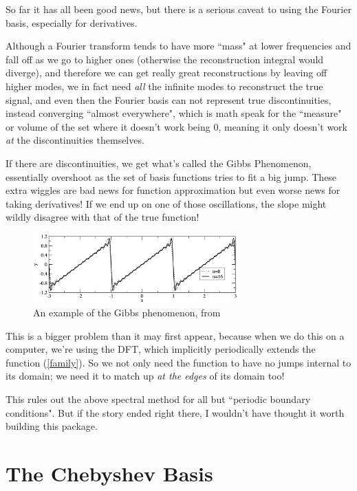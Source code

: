 \documentclass[10pt]{article}
\begin{document}
So far it has all been good news, but there is a serious caveat to using the Fourier basis, especially for derivatives.

Although a Fourier transform tends to have more ``mass" at lower frequencies and fall off as we go to higher ones (otherwise the reconstruction integral would diverge), and therefore we can get really great reconstructions by leaving off higher modes\cite{kutz}, we in fact need \textit{all} the infinite modes to reconstruct the true signal\cite{oppenheim}, and even then the Fourier basis can not represent true discontinuities, instead converging ``almost everywhere", which is math speak for the ``measure" or volume of the set where it doesn't work being 0, meaning it only doesn't work \textit{at} the discontinuities themselves.\cite{oppenheim}

If there are discontinuities, we get what's called the Gibbs Phenomenon\cite{oppenheim}, essentially overshoot as the set of basis functions tries to fit a big jump. These extra wiggles are bad news for function approximation but even worse news for taking derivatives! If we end up on one of those oscillations, the slope might wildly disagree with that of the true function!

\begin{figure}[h!]
	\centering
	\includegraphics[width=0.7\textwidth]{gibbs.png}
	\caption*{An example of the Gibbs phenomenon, from \cite{kutz}}
\end{figure}

This is a bigger problem than it may first appear, because when we do this on a computer, we're using the DFT, which implicitly periodically extends the function (\autoref{family}). So we not only need the function to have no jumps internal to its domain; we need it to match up \textit{at the edges} of its domain too!

This rules out the above spectral method for all but ``periodic boundary conditions"\cite{kutz}. But if the story ended right there, I wouldn't have thought it worth building this package.

\section{The Chebyshev Basis}
\end{document}
